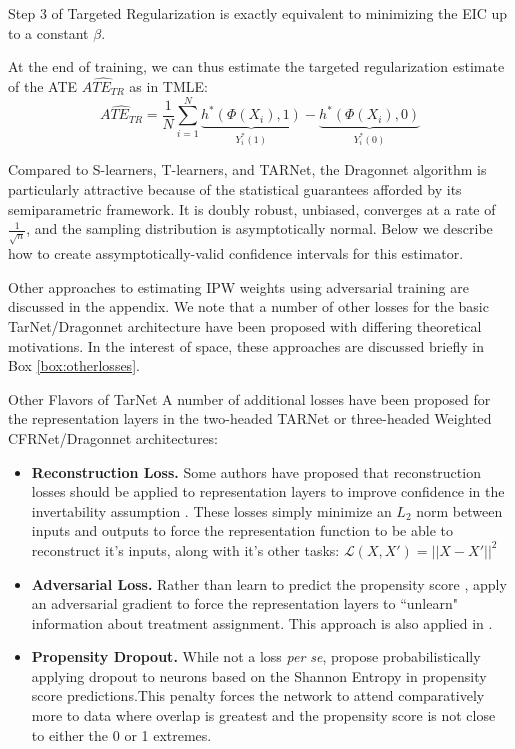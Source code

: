 Step 3 of Targeted Regularization is exactly equivalent to minimizing the EIC up to a constant $\beta$. 

At the end of training, we can thus estimate the targeted regularization estimate of  the ATE $\hat{ATE_{TR}}$ as in TMLE:
$$\hat{ATE_{TR}}=\frac{1}{N}\sum_{i=1}^N{ \underbrace{h^*(\Phi(X_i),1)}_{Y^*_i(1)}-\underbrace{ h^*(\Phi(X_i),0)}_{Y^*_i(0)}}$$

Compared to S-learners, T-learners, and TARNet, the Dragonnet algorithm is particularly attractive because of the statistical guarantees afforded by its semiparametric framework. It is doubly robust, unbiased,  converges at a rate of $\frac{1}{\sqrt{n}}$, and the sampling distribution is asymptotically normal. Below we describe how to create assymptotically-valid confidence intervals for this estimator.


\iffalse  

Other approaches to estimating IPW weights using adversarial training are discussed in the appendix. We note that a number of other losses for the basic TarNet/Dragonnet architecture have been proposed with differing theoretical motivations. In the interest of space, these approaches are discussed briefly in Box \ref{box:otherlosses}.

\begin{TCBBox}[label=box:otherlosses]{Other Flavors of TarNet}
A number of additional losses have been proposed for the representation layers in the two-headed TARNet or three-headed Weighted CFRNet/Dragonnet architectures:
\begin{itemize}
\singlespacing
\item \textbf{Reconstruction Loss.} Some authors have proposed that reconstruction losses should be applied to representation layers to improve confidence in the invertability assumption \citep{Du2019,zhang2020learning}. These losses simply minimize an $L_2$ norm between inputs and outputs to force the representation function to be able to reconstruct it's inputs, along with it's other tasks: $\mathcal{L}(X,X')=||X-X'||^2$
\item \textbf{Adversarial Loss.} Rather than learn to predict the propensity score \citet{Du2019}, apply an adversarial gradient to force the representation layers to ``unlearn" information about treatment assignment. This approach is also applied in \citet{bica2020estimating}.
\item \textbf{Propensity Dropout.} While not a loss \textit{per se}, \citet{Alaa2017} propose probabilistically applying dropout to neurons based on the Shannon Entropy in propensity score predictions.This penalty forces the network to attend comparatively more to data where overlap is greatest and the propensity score is not close to either the 0 or 1 extremes.
\end{itemize}
\end{TCBBox}


